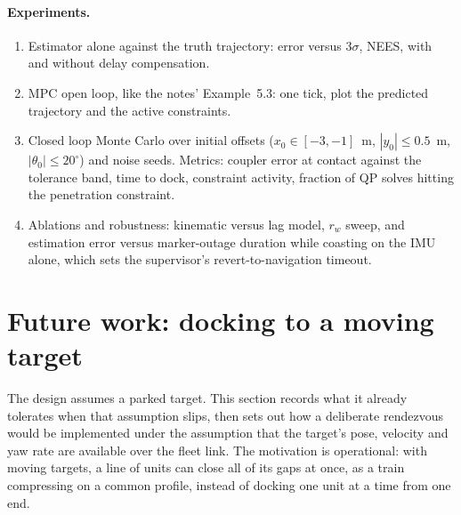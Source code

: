 \documentclass[11pt,a4paper]{article}
\begin{document}
\paragraph{Experiments.}
\begin{enumerate}[nosep]
  \item Estimator alone against the truth trajectory: error versus $3\sigma$, NEES, with and without delay compensation.
  \item MPC open loop, like the notes' Example~5.3: one tick, plot the predicted trajectory and the active constraints.
  \item Closed loop Monte Carlo over initial offsets ($x_0\in[-3,-1]$~m, $|y_0|\le 0.5$~m, $|\theta_0|\le 20^\circ$) and noise seeds. Metrics: coupler error at contact against the tolerance band, time to dock, constraint activity, fraction of QP solves hitting the penetration constraint.
  \item Ablations and robustness: kinematic versus lag model, $r_w$ sweep, and estimation error versus marker-outage duration while coasting on the IMU alone, which sets the supervisor's revert-to-navigation timeout.
\end{enumerate}

\section{Future work: docking to a moving target}
\label{sec:moving}

The design assumes a parked target. This section records what it already tolerates when that assumption slips, then sets out how a deliberate rendezvous would be implemented under the assumption that the target's pose, velocity and yaw rate are available over the fleet link. The motivation is operational: with moving targets, a line of units can close all of its gaps at once, as a train compressing on a common profile, instead of docking one unit at a time from one end.
\end{document}
